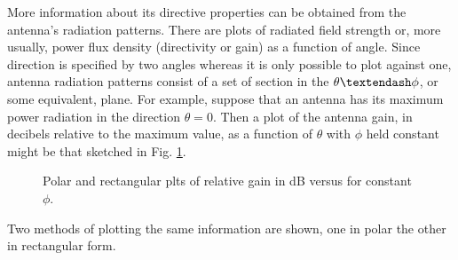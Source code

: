 More information about its directive properties can be obtained from the antenna's radiation patterns. There are plots of radiated field strength or, more usually, power flux density (directivity or gain) as a function of angle. Since direction is specified by two angles whereas it is only possible to plot against one, antenna radiation patterns consist of a set of section in the $\theta\textendash\phi$, or some equivalent, plane. For example, suppose that an antenna has its maximum power radiation in the direction $\theta=0$. Then a plot of the antenna gain, in decibels relative to the maximum value, as a function of $\theta$ with $\phi$ held constant might be that sketched in Fig. \ref{fig:pol-rec}.
\begin{figure}[htbp]
	\begin{center}
	\end{center}
	\caption{Polar and rectangular plts of relative gain in dB versus for constant $\phi$.} 
	\label{fig:pol-rec}
\end{figure}
Two methods of plotting the same information are shown, one in polar the other in rectangular form.

